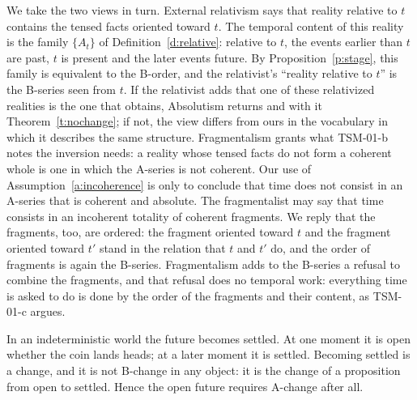 \documentclass{situationist-preprint}
\begin{document}
\begin{reply}
We take the two views in turn. External relativism says that reality relative to $t$ contains the tensed facts oriented toward $t$. The temporal content of this reality is the family $\{A_t\}$ of Definition~\ref{d:relative}: relative to $t$, the events earlier than $t$ are past, $t$ is present and the later events future. By Proposition~\ref{p:stage}, this family is equivalent to the B-order, and the relativist's \enquote{reality relative to $t$} is the B-series seen from $t$. If the relativist adds that one of these relativized realities is the one that obtains, Absolutism returns and with it Theorem~\ref{t:nochange}; if not, the view differs from ours in the vocabulary in which it describes the same structure. Fragmentalism grants what TSM-01-b notes the inversion needs: a reality whose tensed facts do not form a coherent whole is one in which the A-series is not coherent. Our use of Assumption~\ref{a:incoherence} is only to conclude that time does not consist in an A-series that is coherent and absolute. The fragmentalist may say that time consists in an incoherent totality of coherent fragments. We reply that the fragments, too, are ordered: the fragment oriented toward $t$ and the fragment oriented toward $t'$ stand in the relation that $t$ and $t'$ do, and the order of fragments is again the B-series. Fragmentalism adds to the B-series a refusal to combine the fragments, and that refusal does no temporal work: everything time is asked to do is done by the order of the fragments and their content, as TSM-01-c argues.
\end{reply}

\begin{objection}\label{o:becoming}
In an indeterministic world the future becomes settled. At one moment it is open whether the coin lands heads; at a later moment it is settled. Becoming settled is a change, and it is not B-change in any object: it is the change of a proposition from open to settled. Hence the open future requires A-change after all.
\end{objection}
\end{document}
